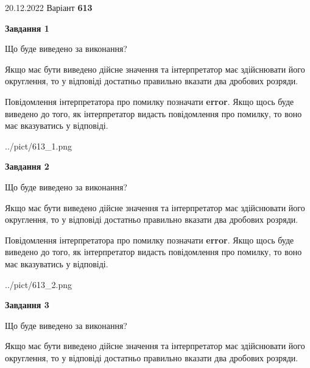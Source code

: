 \documentclass[12pt, ukrainian]{article}
\begin{document}
{20.12.2022 Варіант \No \textbf { 613 }\par}
{
\begin {Large}

{\begin {center}\textbf{Завдання 1}\end {center}}\par
Що буде виведено за виконання? \par

Якщо має бути виведено дійсне значення та інтерпретатор має здійснювати його округлення, 
то у відповіді достатньо правильно вказати два дробових розряди.

Повідомлення інтерпретатора про помилку позначати \textbf{error}.
Якщо щось буде виведено до того, як інтерпретатор видасть повідомлення про помилку, 
то воно має вказуватись у відповіді. \par

\begin{center}
	{../pict/613_1.png}
\end{center}
\newpage

{\begin {center}\textbf{Завдання 2}\end {center}}\par
Що буде виведено за виконання? \par

Якщо має бути виведено дійсне значення та інтерпретатор має здійснювати його округлення, 
то у відповіді достатньо правильно вказати два дробових розряди.

Повідомлення інтерпретатора про помилку позначати \textbf{error}.
Якщо щось буде виведено до того, як інтерпретатор видасть повідомлення про помилку, 
то воно має вказуватись у відповіді. \par

\begin{center}
	{../pict/613_2.png}
\end{center}
\newpage

{\begin {center}\textbf{Завдання 3}\end {center}}\par
Що буде виведено за виконання? \par

Якщо має бути виведено дійсне значення та інтерпретатор має здійснювати його округлення, 
то у відповіді достатньо правильно вказати два дробових розряди.


\end{Large}}
\end{document}
